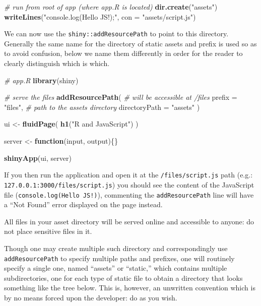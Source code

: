 \documentclass[
]{krantz}
\makeatletter
\newenvironment{Shaded}{\begin{snugshade}}{\end{snugshade}}
\newcommand{\CommentTok}[1]{\textcolor[rgb]{0.37,0.37,0.37}{\textit{#1}}}
\newcommand{\ControlFlowTok}[1]{\textcolor[rgb]{0.27,0.27,0.27}{\textbf{#1}}}
\newcommand{\DataTypeTok}[1]{\textcolor[rgb]{0.27,0.27,0.27}{#1}}
\newcommand{\KeywordTok}[1]{\textcolor[rgb]{0.27,0.27,0.27}{\textbf{#1}}}
\newcommand{\NormalTok}[1]{#1}
\newcommand{\StringTok}[1]{\textcolor[rgb]{0.5,0.5,0.5}{#1}}
\newenvironment{kframe}{%
\medskip{}
\setlength{\fboxsep}{.8em}
 \def\at@end@of@kframe{}%
 \ifinner\ifhmode%
  \def\at@end@of@kframe{\end{minipage}}%
  \begin{minipage}{\columnwidth}%
 \fi\fi%
 \def\FrameCommand##1{\hskip\@totalleftmargin \hskip-\fboxsep
 \colorbox{shadecolor}{##1}\hskip-\fboxsep
     \hskip-\linewidth \hskip-\@totalleftmargin \hskip\columnwidth}%
 \MakeFramed {\advance\hsize-\width
   \@totalleftmargin\z@ \linewidth\hsize
   \@setminipage}}%
 {\par\unskip\endMakeFramed%
 \at@end@of@kframe}
\renewenvironment{Shaded}{\begin{kframe}}{\end{kframe}}
\makeatother
\begin{document}
\begin{Shaded}
\begin{Highlighting}[]
\CommentTok{\# run from root of app (where app.R is located)}
\KeywordTok{dir.create}\NormalTok{(}\StringTok{"assets"}\NormalTok{)}
\KeywordTok{writeLines}\NormalTok{(}\StringTok{"console.log(\textquotesingle{}Hello JS!\textquotesingle{});"}\NormalTok{, }\DataTypeTok{con =} \StringTok{"assets/script.js"}\NormalTok{)}
\end{Highlighting}
\end{Shaded}

We can now use the \texttt{shiny::addResourcePath} to point to this directory. Generally the same name for the directory of static assets and prefix is used so as to avoid confusion, below we name them differently in order for the reader to clearly distinguish which is which.

\begin{Shaded}
\begin{Highlighting}[]
\CommentTok{\# app.R}
\KeywordTok{library}\NormalTok{(shiny)}

\CommentTok{\# serve the files}
\KeywordTok{addResourcePath}\NormalTok{(}
  \CommentTok{\# will be accessible at /files}
  \DataTypeTok{prefix =} \StringTok{"files"}\NormalTok{, }
  \CommentTok{\# path to the assets directory}
  \DataTypeTok{directoryPath =} \StringTok{"assets"}
\NormalTok{)}

\NormalTok{ui <{-}}\StringTok{ }\KeywordTok{fluidPage}\NormalTok{(}
  \KeywordTok{h1}\NormalTok{(}\StringTok{"R and JavaScript"}\NormalTok{)}
\NormalTok{)}

\NormalTok{server <{-}}\StringTok{ }\ControlFlowTok{function}\NormalTok{(input, output)\{\}}

\KeywordTok{shinyApp}\NormalTok{(ui, server)}
\end{Highlighting}
\end{Shaded}

If you then run the application and open it at the \texttt{/files/script.js} path (e.g.: \texttt{127.0.0.1:3000/files/script.js}) you should see the content of the JavaScript file (\texttt{console.log(\textquotesingle{}Hello\ JS!\textquotesingle{})}), commenting the \texttt{addResourcePath} line will have a ``Not Found'' error displayed on the page instead.

All files in your asset directory will be served online and accessible to anyone: do not place sensitive files in it.

Though one may create multiple such directory and correspondingly use \texttt{addResourcePath} to specify multiple paths and prefixes, one will routinely specify a single one, named ``assets'' or ``static,'' which contains multiple subdirectories, one for each type of static file to obtain a directory that looks something like the tree below. This is, however, an unwritten convention which is by no means forced upon the developer: do as you wish.
\end{document}
